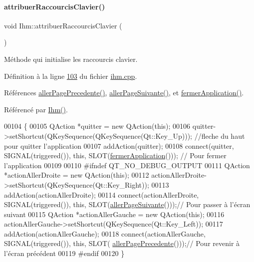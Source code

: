 \paragraph{\texorpdfstring{attribuer\+Raccourcis\+Clavier()}{attribuerRaccourcisClavier()}}
{\footnotesize\ttfamily void Ihm\+::attribuer\+Raccourcis\+Clavier (\begin{DoxyParamCaption}{ }\end{DoxyParamCaption})\hspace{0.3cm}{\ttfamily [private]}}



Méthode qui initialise les raccourcis clavier. 



Définition à la ligne \hyperlink{ihm_8cpp_source_l00103}{103} du fichier \hyperlink{ihm_8cpp_source}{ihm.\+cpp}.



Références \hyperlink{ihm_8cpp_source_l00439}{aller\+Page\+Precedente()}, \hyperlink{ihm_8cpp_source_l00416}{aller\+Page\+Suivante()}, et \hyperlink{ihm_8cpp_source_l00453}{fermer\+Application()}.



Référencé par \hyperlink{ihm_8cpp_source_l00026}{Ihm()}.


\begin{DoxyCode}
00104 \{
00105     QAction *quitter = \textcolor{keyword}{new} QAction(\textcolor{keyword}{this});
00106     quitter->setShortcut(QKeySequence(QKeySequence(Qt::Key\_Up)));       \textcolor{comment}{//fleche du haut pour quitter
       l'application}
00107     addAction(quitter);
00108     connect(quitter, SIGNAL(triggered()), \textcolor{keyword}{this}, SLOT(\hyperlink{class_ihm_a703fa568eb3a2fb7f912decad222817e}{fermerApplication}()));   \textcolor{comment}{// Pour
       fermer l'application}
00109 
00110 \textcolor{preprocessor}{#ifndef QT\_NO\_DEBUG\_OUTPUT}
00111     QAction *actionAllerDroite = \textcolor{keyword}{new} QAction(\textcolor{keyword}{this});
00112     actionAllerDroite->setShortcut(QKeySequence(Qt::Key\_Right));
00113     addAction(actionAllerDroite);
00114     connect(actionAllerDroite, SIGNAL(triggered()), \textcolor{keyword}{this}, SLOT(\hyperlink{class_ihm_a3c53027b16e9ed5f669b9865b2057e6a}{allerPageSuivante}()));\textcolor{comment}{//
       Pour passer à l'écran suivant}
00115     QAction *actionAllerGauche = \textcolor{keyword}{new} QAction(\textcolor{keyword}{this});
00116     actionAllerGauche->setShortcut(QKeySequence(Qt::Key\_Left));
00117     addAction(actionAllerGauche);
00118     connect(actionAllerGauche, SIGNAL(triggered()), \textcolor{keyword}{this}, SLOT(
      \hyperlink{class_ihm_ac63f9c49fbde4482bb28e7f7e5882b25}{allerPagePrecedente}()));\textcolor{comment}{// Pour revenir à l'écran précédent}
00119 \textcolor{preprocessor}{#endif}
00120 \}
\end{DoxyCode}
\mbox{\label{class_ihm_a28b5dd043c4d752bb944110d8d8457aa}} 
